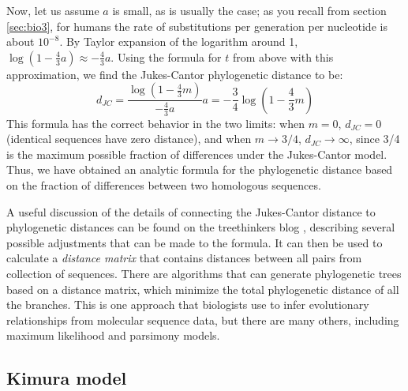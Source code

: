\documentclass[
  letterpaper,
  DIV=11,
  numbers=noendperiod]{scrreprt}
\begin{document}
Now, let us assume \(a\) is small, as is usually the case; as you recall
from section \ref{sec:bio3}, for humans the rate of substitutions per
generation per nucleotide is about \(10^{-8}\). By Taylor expansion of
the logarithm around 1,
\(\log (1 - \frac{4}{3} a) \approx - \frac{4}{3}a\). Using the formula
for \(t\) from above with this approximation, we find the Jukes-Cantor
phylogenetic distance to be:
\[ d_{JC} = \frac{\log (1 -  \frac{4}{3} m)}{ - \frac{4}{3}a} a =  -\frac{3}{4}\log (1 -  \frac{4}{3} m)\]
This formula has the correct behavior in the two limits: when \(m = 0\),
\(d_{JC} = 0\) (identical sequences have zero distance), and when
\(m \rightarrow 3/4\), \(d_{JC} \rightarrow \infty\), since 3/4 is the
maximum possible fraction of differences under the Jukes-Cantor model.
Thus, we have obtained an analytic formula for the phylogenetic distance
based on the fraction of differences between two homologous sequences.

A useful discussion of the details of connecting the Jukes-Cantor
distance to phylogenetic distances can be found on the treethinkers blog
\cite{thomson_jukes_2013}, describing several possible adjustments that
can be made to the formula. It can then be used to calculate a
\emph{distance matrix} that contains distances between all pairs from
collection of sequences. There are algorithms that can generate
phylogenetic trees based on a distance matrix, which minimize the total
phylogenetic distance of all the branches. This is one approach that
biologists use to infer evolutionary relationships from molecular
sequence data, but there are many others, including maximum likelihood
and parsimony models.

\hypertarget{kimura-model}{%
\subsection{Kimura model}\label{kimura-model}}
\end{document}
